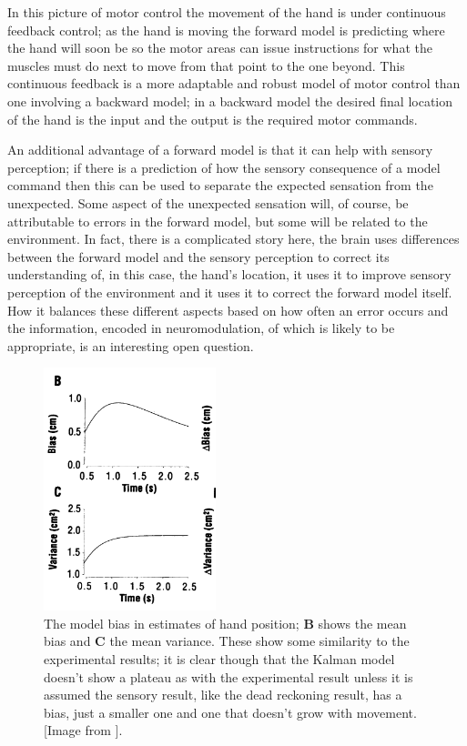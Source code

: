 \documentclass[12pt]{article}
\begin{document}
In this picture of motor control the movement of the hand is under
continuous feedback control; as the hand is moving the forward model
is predicting where the hand will soon be so the motor areas can issue
instructions for what the muscles must do next to move from that point
to the one beyond. This continuous feedback is a more adaptable and
robust model of motor control than one involving a backward model; in
a backward model the desired final location of the hand is the input
and the output is the required motor commands. 

An additional advantage of a forward model is that it can help with
sensory perception; if there is a prediction of how the sensory
consequence of a model command then this can be used to separate the
expected sensation from the unexpected. Some aspect of the unexpected
sensation will, of course, be attributable to errors in the forward
model, but some will be related to the environment. In fact, there is
a complicated story here, the brain uses differences between the
forward model and the sensory perception to correct its understanding
of, in this case, the hand's location, it uses it to improve sensory
perception of the environment and it uses it to correct the forward
model itself. How it balances these different aspects based on how
often an error occurs and the information, encoded in neuromodulation,
of which is likely to be appropriate, is an interesting open question.


\begin{figure}
\begin{center}
  \includegraphics[width=5cm]{fig_model.png}
\end{center}
\caption{The model bias in estimates of hand position; \textbf{B}
  shows the mean bias and \textbf{C} the mean variance. These show
  some similarity to the experimental results; it is clear though that
  the Kalman model doesn't show a plateau as with the experimental
  result unless it is assumed the sensory result, like the dead
  reckoning result, has a bias, just a smaller one and one that
  doesn't grow with movement. [Image from
    \cite{WolpertEtAl1995}].\label{fig_model}}
\end{figure}
\end{document}
